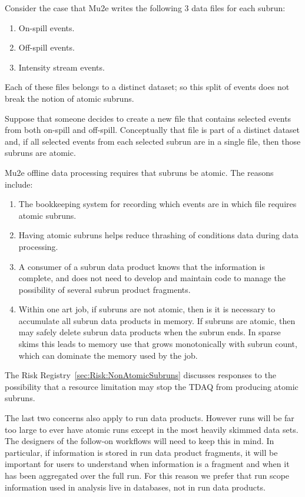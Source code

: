 Consider the case that Mu2e writes the following 3 data files for each subrun:
\begin{enumerate}
\item On-spill events.
\item Off-spill events.
\item Intensity stream events.
\end{enumerate}
Each of these files belongs to a distinct dataset; so this split of events does not break the notion
of atomic subruns.

Suppose that someone decides to create a new file that contains selected events from both on-spill
and off-spill.  Conceptually that file is part of a distinct dataset and, if all selected events from
each selected subrun are in a single file, then those subruns are atomic.

Mu2e offline data processing requires that subruns be atomic.  The reasons include:
\begin{enumerate}
\item The bookkeeping system for recording which events are in which file requires atomic subruns.
\item Having atomic subruns helps reduce thrashing of conditions data during data processing.
\item A consumer of a subrun data product knows that the information is complete, and does not need
  to develop and maintain code to manage the possibility of several subrun product fragments.
\item Within one art job, if subruns are not atomic,
  then is it is necessary to accumulate all subrun data products in memory.
  If subruns are atomic, then \art may safely delete subrun data products when the subrun ends.
  In sparse skims this leads to memory use that grows monotonically with subrun count,
  which can dominate the memory used by the job.
\end{enumerate}

The Risk Registry~\ref{sec:Risk:NonAtomicSubruns} discusses responses to the possibility
that a resource limitation may stop the TDAQ from producing atomic subruns.

The last two concerns also apply to run data products.
However runs will be far too large to ever have atomic runs except in the most heavily skimmed data sets.
The designers of the follow-on workflows will need to keep this in mind.
In particular, if information is stored in run data product fragments, it will be important for users
to understand when information is a fragment and when it has been aggregated over the full run.
For this reason we prefer that run scope information used in analysis live in databases, not in run data products.

